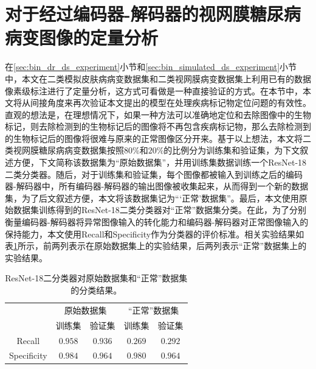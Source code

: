 \section{对于经过编码器-解码器的视网膜糖尿病病变图像的定量分析}\label{sec:indirect_quantitative_evaluation}
在\ref{sec:bin_dr_ds_experiment}小节和\ref{sec:bin_simulated_ds_experiment}小节中，本文在二类模拟皮肤病病变数据集和二类视网膜病变数据集上利用已有的数据像素级标注进行了定量分析，这方式可看做是一种直接验证的方式。在本节中，本文将从间接角度来再次验证本文提出的模型在处理疾病标记物定位问题的有效性。直观的想法是，在理想情况下，如果一种方法可以准确地定位和去除图像中的生物标记，则去除检测到的生物标记后的图像将不再包含疾病标记物，那么去除检测到的生物标记后的图像将很难与原来的正常图像区分开来。基于以上想法，本文将二类视网膜糖尿病病变数据集按照$80$\%和$20$\%的比例分为训练集和验证集，为下文叙述方便，下文简称该数据集为“原始数据集”，并用训练集数据训练一个ResNet-18二类分类器。随后，对于训练集和验证集，每个图像都被输入到训练之后的编码器-解码器中，所有编码器-解码器的输出图像被收集起来，从而得到一个新的数据集，为了后文叙述方便，本文将该数据集记为“‘正常’数据集”。最后，本文使用原始数据集训练得到的ResNet-18二类分类器对“正常”数据集分类。在此，为了分别衡量编码器-解码器将异常图像输入的转化能力和编码器-解码器对正常图像输入的保持能力，本文使用Recall和Specificity作为分类器的评价标准。相关实验结果如表\ref{tab:quantitative_retinal}所示，前两列表示在原始数据集上的实验结果，后两列表示“正常”数据集上的实验结果。

\begin{table}[h!]
	\begin{center}
		\caption[原始数据集和“正常”数据集分类结果]{ResNet-18二分类器对原始数据集和“正常”数据集的分类结果。} 
		\label{tab:quantitative_retinal}
		\begin{tabular}{c|cc|cc}
			\toprule[2pt]
			& \multicolumn{2}{c|}{原始数据集} & \multicolumn{2}{c}{“正常”数据集} \\
			&  训练集 & 验证集 & 训练集 & 验证集\\
			\midrule[2pt]
			Recall & $0.958$ & $0.936$ & $0.269$ & $0.292$\\ \hline
			Specificity & $0.984$ & $0.964$ & $0.980$ & $0.964$\\
			\bottomrule[2pt]
		\end{tabular} 
	\end{center}
\end{table}

